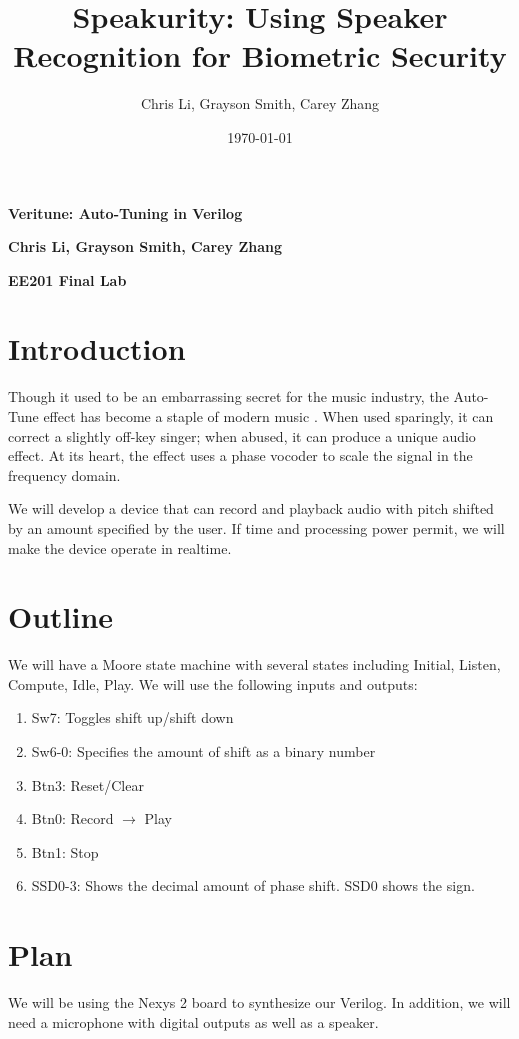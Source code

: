 \documentclass[11pt,letterpaper,oneside]{article}
\begin{document}
	\thispagestyle{empty}
	\title{Speakurity: Using Speaker Recognition for Biometric Security}
	\author{Chris Li, Grayson Smith, Carey Zhang}
	\date{\today}
	
	\centerline{\Large \bf Veritune: Auto-Tuning in Verilog} %
  
	\medskip
  
	\centerline{\bf Chris Li, Grayson Smith, Carey Zhang}
	\centerline{\bf EE201 Final Lab}
	
	\section{Introduction}
	Though it used to be an embarrassing secret for the music industry, the Auto-Tune effect has become a staple of modern music \cite{autotune}. 
	When used sparingly, it can correct a slightly off-key singer; 
	when abused, it can produce a unique audio effect.  
	At its heart, the effect uses a phase vocoder to scale the signal in the frequency domain.
	
	We will develop a device that can record and playback audio with pitch shifted by an amount specified by the user.
	If time and processing power permit, we will make the device operate in realtime.
	\section{Outline}
	We will have a Moore state machine with several states including Initial, Listen, Compute, Idle, Play.  We will use the following inputs and outputs:
	\begin{enumerate}
		\item Sw7: Toggles shift up/shift down
		\item Sw6-0: Specifies the amount of shift as a binary number
		\item Btn3: Reset/Clear
		\item Btn0: Record $\rightarrow$ Play
		\item Btn1: Stop
		\item SSD0-3: Shows the decimal amount of phase shift.  SSD0 shows the sign.
	\end{enumerate}
	
	\section{Plan}
	We will be using the Nexys 2 board to synthesize our Verilog.  In addition, we will need a microphone with digital outputs as well as a speaker.
	
\end{document}
